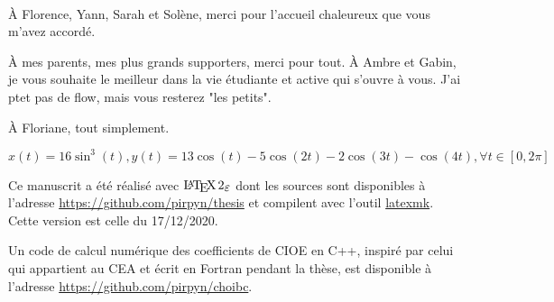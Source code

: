 ~{}\\

À Florence, Yann, Sarah et Solène, merci pour l'accueil chaleureux que vous m'avez accordé.

À mes parents, mes plus grands supporters, merci pour tout. À Ambre et Gabin, je vous souhaite le meilleur dans la vie étudiante et active qui s'ouvre à vous. J'ai ptet pas de flow, mais vous resterez "les petits".

À Floriane, tout simplement.

\href{https://www.wolframalpha.com/input/?i=parametric+plot+x+\%3D+16+sin\%5E3+t\%2C+y+\%3D+13+cos+t+-+5+cos\%282+t\%29+-+2+cos+\%28+3+t+\%29+-cos\%284t\%29}{\(x(t) = 16 \sin^3(t), y(t) = 13 \cos(t) - 5 \cos(2 t) - 2 \cos ( 3 t ) - \cos(4t), \forall t \in [0,2\pi]\)}


Ce manuscrit a été réalisé avec \(\LaTeXe\) dont les sources sont disponibles à l'adresse \url{https://github.com/pirpyn/thesis} et compilent avec l'outil \href{https://mg.readthedocs.io/latexmk.html}{latexmk}. 
Cette version est celle du 17/12/2020.

Un code de calcul numérique des coefficients de CIOE en C++, inspiré par celui qui appartient au CEA et écrit en Fortran pendant la thèse, est disponible à l'adresse \url{https://github.com/pirpyn/choibc}.


